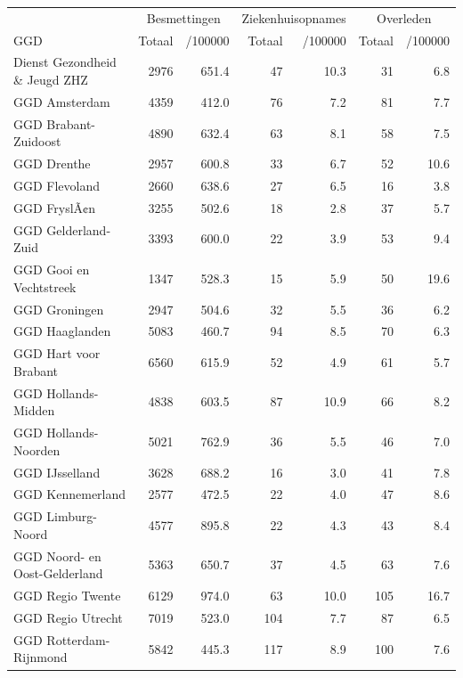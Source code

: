 \documentclass[
  english,
  man,floatsintext]{apa6}
\begin{document}
\begin{table}[H]
\centering\begingroup\fontsize{10}{12}\selectfont

\begin{threeparttable}
\begin{tabular}{lrrrrrr}
\toprule
\multicolumn{1}{c}{ } & \multicolumn{2}{c}{Besmettingen} & \multicolumn{2}{c}{Ziekenhuisopnames} & \multicolumn{2}{c}{Overleden} \\
\cmidrule(l{3pt}r{3pt}){2-3} \cmidrule(l{3pt}r{3pt}){4-5} \cmidrule(l{3pt}r{3pt}){6-7}
GGD & Totaal & /100000 & Totaal & /100000 & Totaal & /100000\\
\midrule
Dienst Gezondheid \& Jeugd ZHZ & 2976 & 651.4 & 47 & 10.3 & 31 & 6.8\\
GGD Amsterdam & 4359 & 412.0 & 76 & 7.2 & 81 & 7.7\\
GGD Brabant-Zuidoost & 4890 & 632.4 & 63 & 8.1 & 58 & 7.5\\
GGD Drenthe & 2957 & 600.8 & 33 & 6.7 & 52 & 10.6\\
GGD Flevoland & 2660 & 638.6 & 27 & 6.5 & 16 & 3.8\\
GGD FryslÃ¢n & 3255 & 502.6 & 18 & 2.8 & 37 & 5.7\\
GGD Gelderland-Zuid & 3393 & 600.0 & 22 & 3.9 & 53 & 9.4\\
GGD Gooi en Vechtstreek & 1347 & 528.3 & 15 & 5.9 & 50 & 19.6\\
GGD Groningen & 2947 & 504.6 & 32 & 5.5 & 36 & 6.2\\
GGD Haaglanden & 5083 & 460.7 & 94 & 8.5 & 70 & 6.3\\
GGD Hart voor Brabant & 6560 & 615.9 & 52 & 4.9 & 61 & 5.7\\
GGD Hollands-Midden & 4838 & 603.5 & 87 & 10.9 & 66 & 8.2\\
GGD Hollands-Noorden & 5021 & 762.9 & 36 & 5.5 & 46 & 7.0\\
GGD IJsselland & 3628 & 688.2 & 16 & 3.0 & 41 & 7.8\\
GGD Kennemerland & 2577 & 472.5 & 22 & 4.0 & 47 & 8.6\\
GGD Limburg-Noord & 4577 & 895.8 & 22 & 4.3 & 43 & 8.4\\
GGD Noord- en Oost-Gelderland & 5363 & 650.7 & 37 & 4.5 & 63 & 7.6\\
GGD Regio Twente & 6129 & 974.0 & 63 & 10.0 & 105 & 16.7\\
GGD Regio Utrecht & 7019 & 523.0 & 104 & 7.7 & 87 & 6.5\\
GGD Rotterdam-Rijnmond & 5842 & 445.3 & 117 & 8.9 & 100 & 7.6\\

\end{tabular}
\end{threeparttable}
\end{table}
\end{document}
